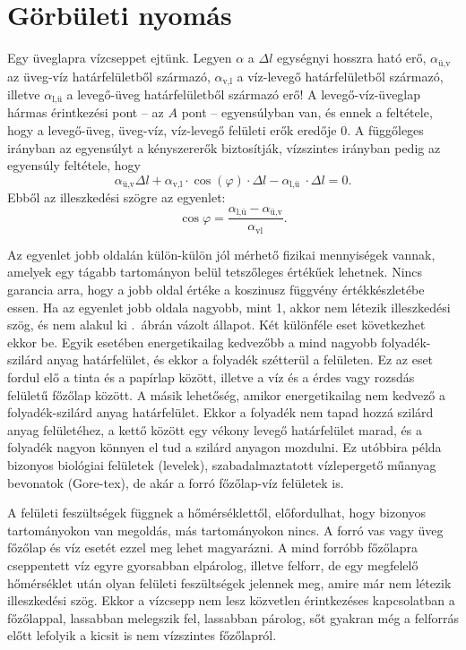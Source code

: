 \documentclass[12pt,a4paper]{scrartcl}
\begin{document}
\normalsize

\section{Görbületi nyomás}

Egy üveglapra vízcseppet ejtünk. Legyen $\alpha$ a $\Delta l$ egységnyi hosszra ható erő, $\alpha_{\text{ü,v}}$ az üveg-víz határfelületből származó, $\alpha_{\text{v,l}}$ a víz-levegő határfelületből származó, illetve $\alpha_{\text{l,ü}}$ a levegő-üveg határfelületből származó erő! A levegő-víz-üveglap hármas érintkezési pont -- az $A$ pont -- egyensúlyban van, és ennek a feltétele, hogy a levegő-üveg, üveg-víz, víz-levegő felületi erők eredője 0. A függőleges irányban az egyensúlyt a kényszererők biztosítják, vízszintes irányban pedig az egyensúly feltétele, hogy 
\[{\alpha _{{\text{ü,v}}}}\Delta l + {\alpha _{{\text{v,l}}}} \cdot \cos \left( \varphi  \right) \cdot \Delta l - {\alpha _{{\text{l,ü }}}} \cdot \Delta l = 0.\]
Ebből az illeszkedési szögre az egyenlet:
\[\cos{\varphi}=\frac{\alpha_{\text{l,ü}}-\alpha_{\text{ü,v}}}{\alpha_{\text{vl}}}.\]

Az egyenlet jobb oldalán külön-külön jól mérhető fizikai mennyiségek vannak, amelyek egy tágabb tartományon belül tetszőleges értékűek lehetnek. Nincs garancia arra, hogy a jobb oldal értéke a koszinusz függvény értékkészletébe essen. Ha az egyenlet jobb oldala nagyobb, mint 1, akkor nem létezik illeszkedési szög, és nem alakul ki .\ ábrán vázolt állapot. Két különféle eset következhet ekkor be. Egyik esetében energetikailag kedvezőbb a mind nagyobb folyadék-szilárd anyag határfelület, és ekkor a folyadék szétterül a felületen. Ez az eset fordul elő a tinta és a papírlap között, illetve a víz és a érdes vagy rozsdás felületű főzőlap között. A másik lehetőség, amikor energetikailag nem kedvező a folyadék-szilárd anyag határfelület. Ekkor a folyadék nem tapad hozzá szilárd anyag felületéhez, a kettő között egy vékony levegő határfelület marad, és a folyadék nagyon könnyen el tud a szilárd anyagon mozdulni. Ez utóbbira példa bizonyos biológiai felületek (levelek), szabadalmaztatott vízlepergető műanyag bevonatok (Gore-tex), de akár a forró főzőlap-víz felületek is.

A felületi feszültségek függnek a hőmérséklettől, előfordulhat, hogy bizonyos tartományokon van megoldás, más tartományokon nincs. A forró vas vagy üveg főzőlap és víz esetét ezzel meg lehet magyarázni. A mind forróbb főzőlapra cseppentett víz egyre gyorsabban elpárolog, illetve felforr, de egy megfelelő hőmérséklet után olyan felületi feszültségek jelennek meg, amire már nem létezik illeszkedési szög. Ekkor a vízcsepp nem lesz közvetlen érintkezéses kapcsolatban a főzőlappal, lassabban melegszik fel, lassabban párolog, sőt gyakran még a felforrás előtt lefolyik a kicsit is nem vízszintes főzőlapról.
\end{document}
